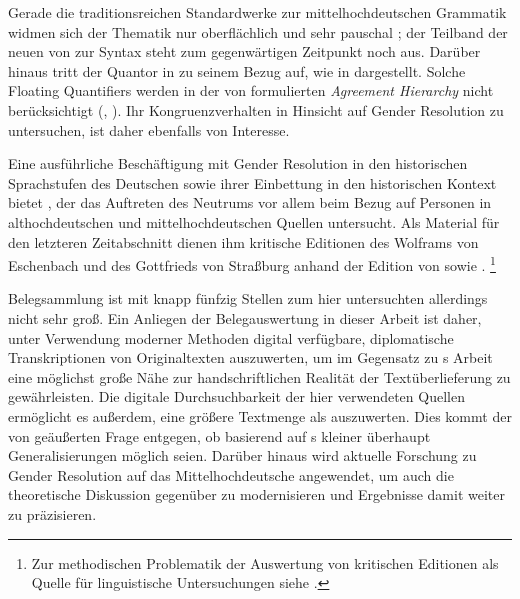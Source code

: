 Gerade die traditionsreichen Standard\-werke zur
mittelhochdeutschen Grammatik widmen sich der Thematik
nur oberflächlich und sehr pauschal \autocites(dazu
)[siehe][384]{paul2007}[188]{dal2014}; der
Teilband der neuen 
von \citeauthor*{ksw2} zur Syntax steht zum gegenwärtigen Zeitpunkt noch aus.
Darüber hinaus tritt der Quantor  in  zu
seinem Bezug auf, wie in  dargestellt. Solche Floating
Quantifiers \autocite{sportiche1988} werden in der von
\citet[204]{corbett1979} formulierten \textit{Agreement Hierarchy} nicht
berücksichtigt (, ). Ihr
Kongruenzverhalten in Hinsicht auf Gender Resolution zu untersuchen, ist daher
ebenfalls von Interesse.

Eine ausführliche Beschäftigung mit Gender Resolution in den
historischen Sprachstufen des Deutschen sowie ihrer Einbettung
in den historischen Kontext bietet \citet{askedal1973}, der das
Auftreten des Neutrums vor allem beim Bezug auf Personen in
althochdeutschen und
mittelhochdeutschen Quellen untersucht. Als Material für
den letzteren Zeitabschnitt dienen ihm kritische
Editionen des  Wolframs von
Eschenbach und des  Gottfrieds von
Straßburg anhand der Edition von
\citet{lachmannhartl1952} sowie \citet{maroldschroeder1969}.%
%
	\footnote{Zur methodischen Problematik der Auswertung von kritischen
		Editionen als Quelle für linguistische
		Untersuchungen siehe .}

 Belegsammlung ist mit knapp fünfzig Stellen zum hier
untersuchten  allerdings nicht sehr groß. Ein Anliegen der
Belegauswertung in dieser Arbeit ist daher, unter Verwendung moderner Methoden
digital verfügbare, diplomatische Transkriptionen von
Originaltexten auszuwerten, um im Gegensatz zu \citeauthor{askedal1973}s Arbeit
eine möglichst große Nähe zur handschriftlichen Realität der Textüberlieferung
zu gewährleisten. Die digitale Durchsuchbarkeit der hier verwendeten Quellen
ermöglicht es außerdem, eine größere Textmenge als \citeauthor{askedal1973}
auszuwerten. Dies kommt der von \citet[118]{fleischerschallert2011} geäußerten
Frage entgegen, ob basierend auf \citeauthor{askedal1973}s kleiner
 überhaupt Generalisierungen möglich seien. Darüber hinaus wird
aktu\-elle Forschung zu Gender Resolution auf das
Mittelhochdeutsche angewendet, um auch die theoretische
Diskussion gegenüber \citet{askedal1973} zu modernisieren und Ergebnisse damit
weiter zu präzisieren.

